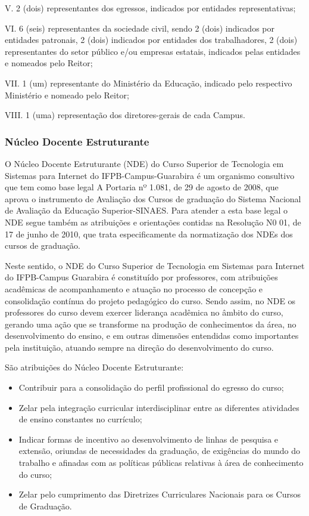 V.	2 (dois) representantes dos egressos, indicados por entidades representativas;

VI.	6 (seis) representantes da sociedade civil, sendo 2 (dois) indicados por entidades patronais, 2 (dois) indicados por entidades dos trabalhadores, 2 (dois) representantes do setor público e/ou empresas estatais, indicados pelas entidades e nomeados pelo Reitor;

VII.	1 (um) representante do Ministério da Educação, indicado pelo respectivo Ministério e nomeado pelo Reitor;

VIII.	1 (uma) representação dos diretores-gerais de cada Campus.

\subsubsection{Núcleo Docente Estruturante}

O Núcleo Docente Estruturante (NDE) do Curso Superior de Tecnologia em Sistemas para Internet do IFPB-Campus-Guarabira é um organismo consultivo que tem como base legal A Portaria nº 1.081, de 29 de agosto de 2008, que aprova o  instrumento de Avaliação dos Cursos de graduação do Sistema Nacional de Avaliação da Educação Superior-SINAES. Para atender a esta base legal o NDE segue também as atribuições e orientações contidas na Resolução N0 01, de 17 de junho de 2010, que trata especificamente da normatização dos NDEs dos cursos de graduação.

       Neste sentido, o NDE do Curso Superior de Tecnologia em Sistemas para Internet do IFPB-Campus Guarabira é constituído por professores, com atribuições acadêmicas de acompanhamento e atuação no processo de concepção e consolidação contínua do projeto pedagógico do curso. Sendo assim, no NDE os professores do curso devem exercer liderança acadêmica no âmbito do curso, gerando uma ação que se transforme na produção de conhecimentos da área, no desenvolvimento do ensino, e em outras dimensões entendidas como importantes pela instituição, atuando sempre na direção do desenvolvimento do curso. 

 	São atribuições do Núcleo Docente Estruturante:
 
\begin{itemize}
	\item Contribuir para a consolidação do perfil profissional do egresso do curso; 

	\item Zelar pela integração curricular interdisciplinar entre as diferentes atividades de ensino constantes no currículo; 

	\item Indicar formas de incentivo ao desenvolvimento de linhas de pesquisa e extensão, oriundas de necessidades da graduação, de exigências do mundo do trabalho e afinadas com as políticas públicas relativas à área de conhecimento do curso; 

	\item Zelar pelo cumprimento das Diretrizes Curriculares Nacionais para os Cursos de Graduação. 
\end{itemize}

